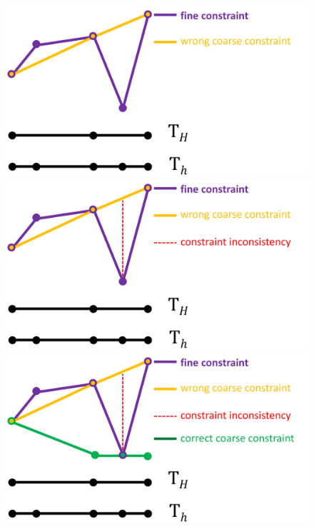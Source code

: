 \documentclass[8pt, oneside]{beamer}   	%
\begin{document}
\begin{frame}
\begin{itemize}
{\begin{figure}[htbp!]
\begin{overprint}
    \centering \includegraphics[scale=0.15]{img/coarseconstraintrepresentation2.pdf}
    \centering \includegraphics[scale=0.15]{img/coarseconstraintrepresentation3.pdf}
    \centering \includegraphics[scale=0.15]{img/coarseconstraintrepresentation4.pdf}
    \end{overprint}
\end{figure}
}
\end{itemize}
\end{frame}
\end{document}
